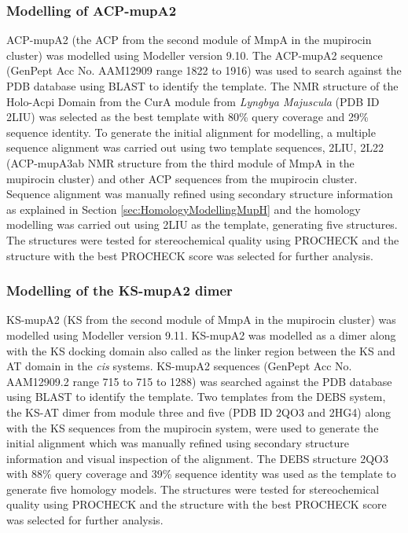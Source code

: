 			\subsubsection{Modelling of ACP-mupA2}
			\label{sec:ACP2modelling}
			ACP-mupA2 (the ACP from the second module of MmpA in the mupirocin cluster) was modelled using Modeller version 9.10. The ACP-mupA2 sequence (GenPept Acc No. AAM12909 range 1822 to 1916) was used to search against the PDB database using BLAST to identify the template. The NMR structure of the Holo-Acpi Domain from the CurA module from \textit{Lyngbya Majuscula} (PDB ID 2LIU) was selected as the best template with 80\% query coverage and 29\% sequence identity. To generate the initial alignment for modelling, a multiple sequence alignment was carried out using two template sequences, 2LIU, 2L22 (ACP-mupA3ab NMR structure from the third module of MmpA in the mupirocin cluster) and other ACP sequences from the mupirocin cluster. Sequence alignment was manually refined using secondary structure information as explained in Section \ref{sec:HomologyModellingMupH} and the homology modelling was carried out using 2LIU as the template, generating five structures. The structures were tested for stereochemical quality using PROCHECK and the structure with the best PROCHECK score was selected for further analysis. 
			
			\subsubsection{Modelling of the KS-mupA2 dimer}
			\label{sec:KS2modelling}
			KS-mupA2 (KS from the second module of MmpA in the mupirocin cluster) was modelled using Modeller version 9.11. KS-mupA2 was modelled as a dimer along with the KS docking domain also called as the linker region between the KS and AT domain in the \textit{cis} systems. KS-mupA2 sequences (GenPept Acc No. AAM12909.2 range 715 to 715 to 1288) was searched against the PDB database using BLAST to identify the template. Two templates from the DEBS system, the KS-AT dimer from module three and five (PDB ID 2QO3 and 2HG4) along with the KS sequences from the mupirocin system, were used to generate the initial alignment which was manually refined using secondary structure information and visual inspection of the alignment. The DEBS structure 2QO3 with 88\% query coverage and 39\% sequence identity was used as the template to generate five homology models. The structures were tested for stereochemical quality using PROCHECK and the structure with the best PROCHECK score was selected for further analysis.
		
